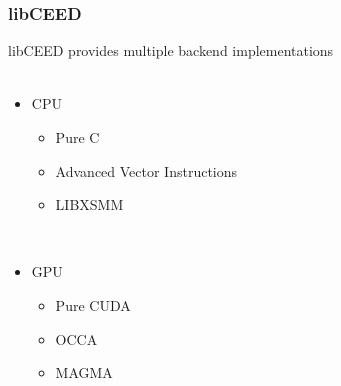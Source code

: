 \documentclass{beamer}
\begin{document}
\begin{frame}
\begin{center}
\frametitle{libCEED}

libCEED provides multiple backend implementations\\

~\\

\begin{itemize}

\item CPU

\begin{itemize}

\item Pure C

\item Advanced Vector Instructions

\item LIBXSMM

\end{itemize}

~\\

\item GPU

\begin{itemize}

\item Pure CUDA

\item OCCA

\item MAGMA

\end{itemize}

\end{itemize}

\end{center}
\end{frame}

\end{document}
